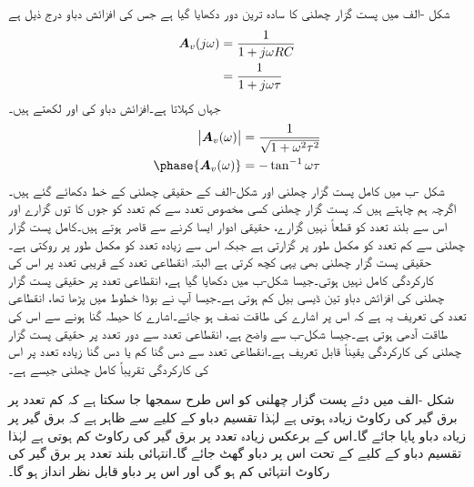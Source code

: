 شکل -الف میں پست گزار چھلنی کا سادہ ترین دور دکھایا گیا ہے جس کی افزائش دباو   درج ذیل ہے
\begin{align*}
{\ensuremath{{\boldsymbol{A}}}}_v(j\omega)&=\frac{1}{1+j\omega RC}\\
&=\frac{1}{1+j\omega \tau}
\end{align*} 
جہاں   کہلاتا ہے۔افزائش دباو کی   اور  لکھتے ہیں۔
\begin{align*}
\abs{\bA_v(\omega)}&=\frac{1}{\sqrt{1+\omega^2 \tau^2}}\\
\phase{\bA_v(\omega)}&=-\tan^{-1} \omega \tau
\end{align*}
شکل -ب میں کامل پست گزار چھلنی اور شکل-الف کے حقیقی چھلنی کے خط دکھائے گئے ہیں۔ اگرچہ ہم چاہتے ہیں کہ پست گزار چھلنی کسی مخصوص تعدد  سے کم تعدد کو جوں کا توں گزارے اور اس سے بلند تعدد کو قطعاً نہیں گزارے، حقیقی ادوار ایسا کرنے سے قاصر ہوتے ہیں۔کامل پست گزار چھلنی   سے کم تعدد کو مکمل طور پر گزارتی ہے جبکہ اس سے زیادہ تعدد کو مکمل طور پر روکتی ہے۔حقیقی پست گزار چھلنی بھی یہی کچھ کرتی ہے البتہ انقطاعی تعدد کے قریبی تعدد پر اس کی کارکردگی کامل نہیں ہوتی۔جیسا شکل-ب میں دکھایا گیا ہے، انقطاعی تعدد  پر حقیقی پست گزار چھلنی کی افزائش دباو  تین ڈیسی بیل کم ہوتی ہے۔جیسا آپ نے بوڈا خطوط میں پڑھا تھا، انقطاعی تعدد کی تعریف یہ ہے کہ اس پر اشارے کی طاقت نصف ہو جائے۔اشارے کا حیطہ  گنا ہونے سے اس کی طاقت آدھی ہوتی ہے۔جیسا شکل-ب سے واضح ہے، انقطاعی تعدد سے دور تعدد پر حقیقی پست گزار چھلنی کی کارکردگی یقیناً قابل تعریف ہے۔انقطاعی تعدد سے دس گنا کم  یا دس گنا زیادہ  تعدد پر اس کی کارکردگی تقریباً کامل چھلنی جیسے ہے۔

شکل -الف میں دئے پست گزار چھلنی کو اس طرح سمجھا جا سکتا ہے کہ کم تعدد پر برق گیر کی رکاوٹ زیادہ ہوتی ہے لہٰذا تقسیم دباو کے کلیے سے ظاہر ہے کہ برق گیر پر زیادہ دباو پایا جائے گا۔اس کے برعکس زیادہ تعدد پر برق گیر کی رکاوٹ کم ہوتی ہے لہٰذا تقسیم دباو کے کلیے کے تحت اس پر دباو گھٹ جائے گا۔انتہائی بلند تعدد پر برق گیر کی رکاوٹ انتہائی کم ہو گی اور اس پر دباو قابل نظر انداز ہو گا۔


